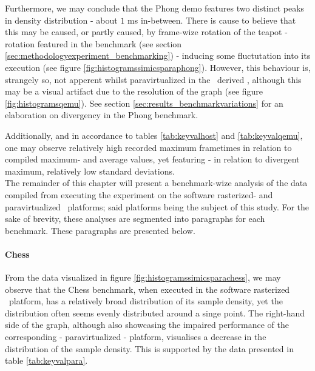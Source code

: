 Furthermore, we may conclude that the Phong demo features two distinct peaks in density distribution - about $1$ ms in-between.
There is cause to believe that this may be caused, or partly caused, by frame-wize rotation of the teapot - rotation featured in the benchmark (see section \ref{sec:methodologyexperiment_benchmarking}) - inducing some fluctutation into its execution (see figure \ref{fig:histogramssimicsparaphong}).
However, this behaviour is, strangely so, not apperent whilst paravirtualized in the \dvttermqemu\ derived \dvttermandroidemulator , although this may be a visual artifact due to the resolution of the graph (see figure \ref{fig:histogramsqemu}).
See section \ref{sec:results_benchmarkvariations} for an elaboration on divergency in the Phong benchmark.

Additionally, and in accordance to tables \ref{tab:keyvalhost} and \ref{tab:keyvalqemu}, one may observe relatively high recorded maximum frametimes in relation to compiled maximum- and average values, yet featuring - in relation to divergent maximum, relatively low standard deviations.\\

\noindent
The remainder of this chapter will present a benchmark-wize analysis of the data compiled from executing the experiment on the software rasterized- and paravirtualized \dvttermsimics\ platforms; said platforms being the subject of this study.
For the sake of brevity, these analyses are segmented into paragraphs for each benchmark.
These paragraphs are presented below.













\paragraph{Chess}
\label{par:results_chess}
From the data visualized in figure \ref{fig:histogramssimicsparachess}, we may observe that the Chess benchmark, when executed in the software rasterized \dvttermsimics\ platform, has a relatively broad distribution of its sample density, yet the distribution often seems evenly distributed around a singe point. %
The right-hand side of the graph, although also showcasing the impaired performance of the corresponding - paravirtualized - platform, visualises a decrease in the distribution of the sample density.
This is supported by the data presented in table \ref{tab:keyvalpara}.

